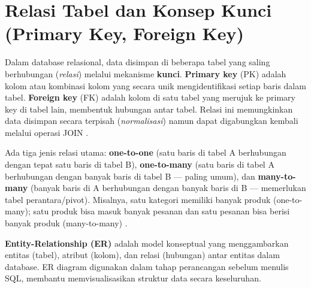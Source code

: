 ﻿\section{Relasi Tabel dan Konsep Kunci (Primary Key, Foreign Key)}

Dalam database relasional, data disimpan di beberapa tabel yang saling berhubungan (\textit{relasi}) melalui mekanisme \textbf{kunci}. \textbf{Primary key} (PK) adalah kolom atau kombinasi kolom yang secara unik mengidentifikasi setiap baris dalam tabel. \textbf{Foreign key} (FK) adalah kolom di satu tabel yang merujuk ke primary key di tabel lain, membentuk hubungan antar tabel. Relasi ini memungkinkan data disimpan secara terpisah (\textit{normalisasi}) namun dapat digabungkan kembali melalui operasi JOIN \cite{mysqlDocs}.

Ada tiga jenis relasi utama: \textbf{one-to-one} (satu baris di tabel A berhubungan dengan tepat satu baris di tabel B), \textbf{one-to-many} (satu baris di tabel A berhubungan dengan banyak baris di tabel B --- paling umum), dan \textbf{many-to-many} (banyak baris di A berhubungan dengan banyak baris di B --- memerlukan tabel perantara/pivot). Misalnya, satu kategori memiliki banyak produk (one-to-many); satu produk bisa masuk banyak pesanan dan satu pesanan bisa berisi banyak produk (many-to-many) \cite{mysqlGettingStarted}.

\begin{konsep}
\textbf{Entity-Relationship (ER)} adalah model konseptual yang menggambarkan entitas (tabel), atribut (kolom), dan relasi (hubungan) antar entitas dalam database. ER diagram digunakan dalam tahap perancangan sebelum menulis SQL, membantu memvisualisasikan struktur data secara keseluruhan.
\end{konsep}

